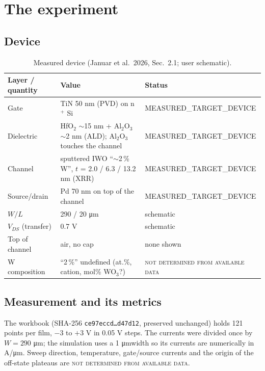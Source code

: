 \documentclass[11pt,a4paper]{article}
\newcommand{\um}{\si{\micro\metre}}
\newcommand{\Aum}{A/\si{\micro\metre}}
\newcommand{\ND}{\textsc{not determined from available data}}
\begin{document}
\section{The experiment}
\subsection{Device}
\begin{table}[H]\centering\small
\caption{Measured device (Januar et al.\ 2026, Sec.\ 2.1; user schematic).}
\begin{tabular}{lll}\toprule
Layer / quantity & Value & Status\\\midrule
Gate & TiN 50 nm (PVD) on n$^+$ Si & MEASURED\_TARGET\_DEVICE\\
Dielectric & HfO$_2$ $\sim$15 nm + Al$_2$O$_3$ $\sim$2 nm (ALD); Al$_2$O$_3$ touches the channel & MEASURED\_TARGET\_DEVICE\\
Channel & sputtered IWO ``$\sim$2\,\% W'', $t$ = 2.0 / 6.3 / 13.2 nm (XRR) & MEASURED\_TARGET\_DEVICE\\
Source/drain & Pd 70 nm on top of the channel & MEASURED\_TARGET\_DEVICE\\
$W/L$ & 290 / 20 \um & schematic\\
$V_{DS}$ (transfer) & 0.7 V & schematic\\
Top of channel & air, no cap & none shown\\
W composition & ``2\,\%'' undefined (at.\%, cation, mol\% WO$_3$?) & \ND\\
\bottomrule\end{tabular}
\end{table}

\subsection{Measurement and its metrics}
The workbook (SHA-256 \texttt{ce97eccd\ldots d47d12}, preserved unchanged) holds 121 points per film, $-3$ to $+3$ V in 0.05 V steps. The currents were divided once by $W=290$ \um; the simulation uses a 1 \um width so its currents are numerically in \Aum. Sweep direction, temperature, gate/source currents and the origin of the off-state plateaus are \ND.
\end{document}

